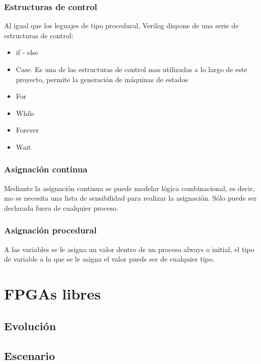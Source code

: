 \subsubsection{Estructuras de control}

Al igual que los leguajes de tipo procedural, Verilog dispone de una serie de estructuras de control:

\begin{itemize}
	\item if - else
	\item Case. Es una de las estructuras de control mas utilizadas a lo largo de este proyecto, permite la generación de máquinas de estados
	\item For
	\item While
	\item Forever
	\item Wait
	
\end{itemize}

\subsubsection{Asignación continua}

Mediante la asignación continua se puede modelar lógica combinacional, es decir, mo se necesita una lista de sensibilidad para realizar la asignación. Sólo puede ser declarada fuera de cualquier proceso.

\subsubsection{Asignación procedural}

A las variables se le asigna un valor dentro de un proceso always o initial, el tipo de variable a la que se le asigna el valor puede ser de cualquier tipo.


\section{FPGAs libres}
\subsection{Evolución}
\subsection{Escenario}
